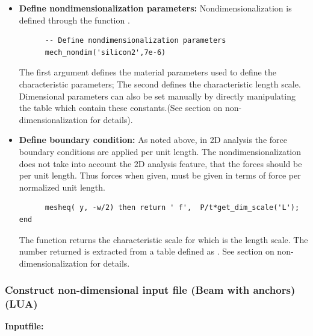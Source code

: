 \begin{itemize}

  \item{\textbf{Define nondimensionalization parameters:}}
  Nondimensionalization is defined through the function . 
  \begin{verbatim}
      -- Define nondimensionalization parameters
      mech_nondim('silicon2',7e-6)
  \end{verbatim}
  The first argument defines the material parameters used to define 
  the characteristic parameters; The second defines the characteristic 
  length scale. Dimensional parameters can also be set manually by
  directly manipulating the table  which contain these
  constants.(See section on non-dimensionalization for details).

  \item{\textbf{Define boundary condition:}}
  As noted above, in 2D analysis the force boundary conditions are applied per
  unit length. The nondimensionalization does not
  take into account the 2D analysis feature, that the forces should be 
  per unit length. Thus forces when given, must be given in terms of 
  force per normalized unit length.
  \begin{verbatim}
      mesheq( y, -w/2) then return ' f',  P/t*get_dim_scale('L'); end
  \end{verbatim}

  The function  returns the characteristic scale 
  for  which is the length scale. The number returned is 
  extracted from a table defined as . See section on
  non-dimensionalization for details.

\end{itemize}
\clearpage
\subsubsection*{Construct non-dimensional input file (Beam with anchors)(LUA)}
\begin{flushleft}
  \textbf{Inputfile:}
  \\
\end{flushleft}
\hspace{1in}
{\footnotesize
{}
}


